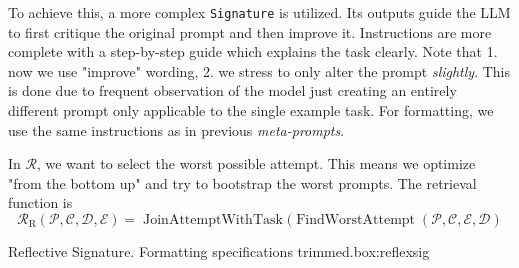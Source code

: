 To achieve this, a more complex \texttt{Signature} is utilized. Its outputs guide the LLM to first critique the original prompt
and then improve it. Instructions are more complete with a step-by-step guide which explains the task clearly.
Note that 1. now we use "improve" wording, 2. we stress to only alter the prompt \textit{slightly}. This is done due to 
frequent observation of the model just creating an entirely different prompt only applicable to the single example task.
For formatting, we use the same instructions as in previous \textit{meta-prompts}.

In $\mathcal{R}$, we want to select the worst possible attempt. This means we optimize "from the bottom up" and try to bootstrap the
worst prompts. The retrieval function is
\begin{equation}
    \mathcal{R}_{\text{R}}(\mathcal{P}, \mathcal{C}, \mathcal{D}, \mathcal{E}) = \operatorname{JoinAttemptWithTask}(\operatorname{FindWorstAttempt}(\mathcal{P}, \mathcal{C}, \mathcal{E}, \mathcal{D})
\end{equation}

\begin{figurebox}{Reflective Signature. Formatting specifications trimmed.}{box:reflexsig}

\end{figurebox}


